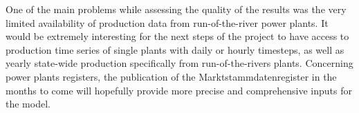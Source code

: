 One of the main problems while assessing the quality of the results was the very limited availability of production data from run-of-the-river power plants. It would be extremely interesting for the next steps of the project to have access to production time series of single plants with daily or hourly timesteps, as well as yearly state-wide production specifically from run-of-the-rivers plants. Concerning power plants registers, the publication of the Marktstammdatenregister in the months to come will hopefully provide more precise and comprehensive inputs for the model.
